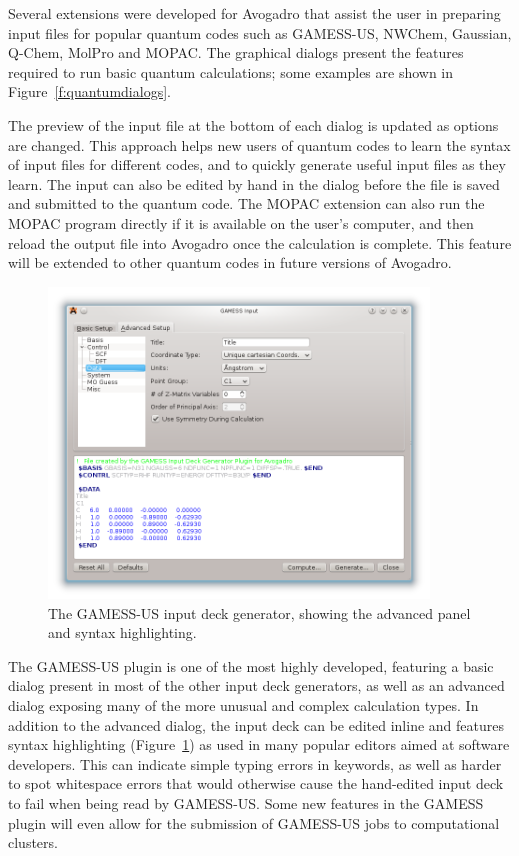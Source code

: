 \documentclass[10pt]{bmc_article}
\newenvironment{bmcformat}{\begin{raggedright}
\baselineskip20pt\sloppy\setboolean{publ}{false}}{\end{raggedright}
\baselineskip20pt\sloppy}
\begin{document}
\begin{bmcformat}
Several extensions were developed for Avogadro that assist the user in preparing
input files for popular quantum codes such as GAMESS-US, NWChem, Gaussian, Q-Chem, MolPro and
MOPAC. The graphical dialogs present the features required to run basic quantum
calculations; some examples are shown in Figure~\ref{f:quantumdialogs}.

The preview of the input file at the bottom of each dialog is updated as options
are changed. This approach helps new users of quantum codes to learn the syntax
of input files for different codes, and to quickly generate useful input files
as they learn. The input can also be edited by hand in the dialog before the file is saved
and submitted to the quantum code. The MOPAC extension can also run the MOPAC
program directly if it is available on the user's computer, and then reload the
output file into Avogadro once the calculation is complete. This
feature will be extended to other quantum codes in future versions of Avogadro.

\begin{figure}
  \begin{center}
    \includegraphics[width=0.9\textwidth]{images/gamess-input}
  \end{center}
  \caption{The GAMESS-US input deck generator, showing the advanced panel and syntax highlighting.}
  \label{f:gamess}
\end{figure}

The GAMESS-US plugin is one of the most highly developed, featuring a basic dialog
present in most of the other input deck generators, as well as an advanced dialog
exposing many of the more unusual and complex calculation types. In addition to
the advanced dialog, the input deck can be edited inline and features syntax
highlighting (Figure~\ref{f:gamess}) as used in many popular editors aimed at software developers. This
can indicate simple typing errors in keywords, as well as harder to spot whitespace
errors that would otherwise cause the hand-edited input deck to fail when being
read by GAMESS-US. Some new features in the GAMESS plugin will even allow
for the submission of GAMESS-US jobs to computational clusters.


\end{bmcformat}
\end{document}
